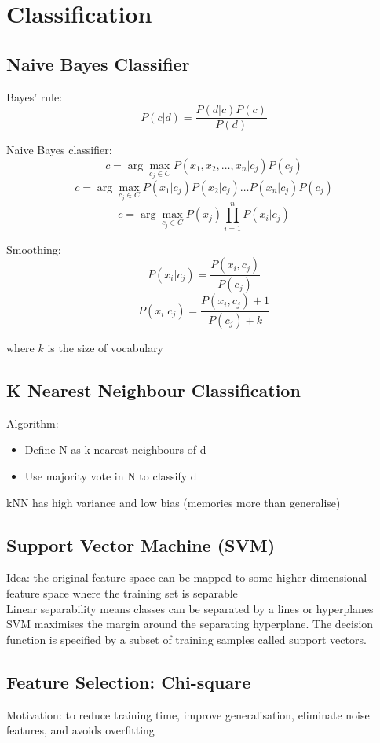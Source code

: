 \chapter{Classification}
\begin{multicols*}{2}

\section{Naive Bayes Classifier}

\noindent Bayes' rule:
$$P(c|d) = \frac{P(d|c) P(c)}{P(d)}$$

\noindent Naive Bayes classifier:
$$c=\arg\!\max_{c_j \in C} P(x_1, x_2, \ldots,x_n|c_j)P(c_j)$$
$$c=\arg\!\max_{c_j \in C} P(x_1|c_j)P(x_2|c_j)\ldots P(x_n|c_j)P(c_j)$$
$$c=\arg\!\max_{c_j \in C} P(x_j) \prod_{i=1}^n P(x_i|c_j)$$

\noindent Smoothing:
$$P(x_i|c_j) = \frac{P(x_i,c_j)}{P(c_j)}$$
$$P(x_i|c_j) = \frac{P(x_i,c_j)+1}{P(c_j)+k}$$

\noindent where $k$ is the size of vocabulary

\section{K Nearest Neighbour Classification}
\noindent Algorithm:
\begin{itemize}
    \item Define N as k nearest neighbours of d
    \item Use majority vote in N to classify d
\end{itemize}
\noindent kNN has high variance and low bias (memories more than generalise)

\section{Support Vector Machine (SVM)}
\noindent Idea: the original feature space can be mapped to some higher-dimensional feature space where the training set is separable\\

\noindent Linear separability means classes can be separated by a lines or hyperplanes\\

\noindent SVM maximises  the margin around the separating hyperplane. The decision function is specified by a subset of training samples called support vectors. 

\section{Feature Selection: Chi-square}
\noindent Motivation: to reduce training time, improve generalisation, eliminate noise features, and avoids overfitting\\


\end{multicols*}
